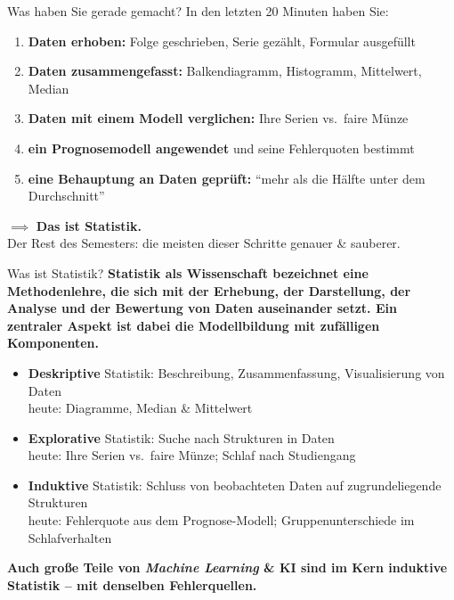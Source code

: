 \documentclass[
  10pt,
  ignorenonframetext,
]{beamer}
\providecommand{\tightlist}{%
  \setlength{\itemsep}{0pt}\setlength{\parskip}{0pt}}
\begin{document}
\begin{frame}{Was haben Sie gerade gemacht?}
\protect\hypertarget{was-haben-sie-gerade-gemacht}{}
In den letzten 20 Minuten haben Sie:

\begin{enumerate}
\tightlist
\item
  \textbf{Daten erhoben:} Folge geschrieben, Serie gezählt, Formular
  ausgefüllt
\item
  \textbf{Daten zusammengefasst:} Balkendiagramm, Histogramm,
  Mittelwert, Median
\item
  \textbf{Daten mit einem Modell verglichen:} Ihre Serien vs.~faire
  Münze
\item
  \textbf{ein Prognosemodell angewendet} und seine Fehlerquoten bestimmt
\item
  \textbf{eine Behauptung an Daten geprüft:} ``mehr als die Hälfte unter
  dem Durchschnitt''
\end{enumerate}

\(\implies\) \textbf{Das ist Statistik.}\\
Der Rest des Semesters: die meisten dieser Schritte genauer \& sauberer.
\end{frame}

\begin{frame}{Was ist Statistik?}
\protect\hypertarget{was-ist-statistik}{}
\textbf{Statistik als Wissenschaft bezeichnet eine Methodenlehre, die
sich mit der Erhebung, der Darstellung, der Analyse und der Bewertung
von Daten auseinander setzt. Ein zentraler Aspekt ist dabei die
Modellbildung mit zufälligen Komponenten.}

\begin{itemize}
\tightlist
\item
  \textbf{Deskriptive} Statistik: Beschreibung, Zusammenfassung,
  Visualisierung von Daten\\
  heute: Diagramme, Median \& Mittelwert
\item
  \textbf{Explorative} Statistik: Suche nach Strukturen in Daten\\
  heute: Ihre Serien vs.~faire Münze; Schlaf nach Studiengang
\item
  \textbf{Induktive} Statistik: Schluss von beobachteten Daten auf
  zugrundeliegende Strukturen\\
  heute: Fehlerquote aus dem Prognose-Modell; Gruppenunterschiede im
  Schlafverhalten
\end{itemize}

\textbf{Auch große Teile von \emph{Machine Learning} \& KI sind im Kern
induktive Statistik -- mit denselben Fehlerquellen.}
\end{frame}
\end{document}
